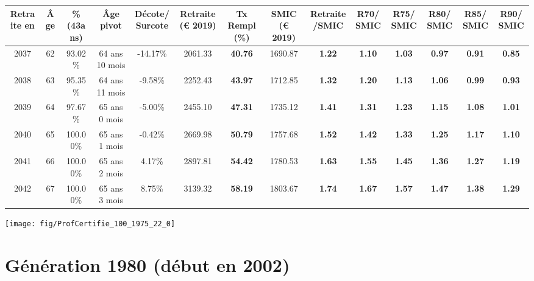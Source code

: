 \begin{adjustbox}{max width=\textwidth} 
\begin{tabular}[htb]{|c|c||c|c|c||c|c||c|c||c|c|c|c|c|} 
\hline 
 Retraite en &  Âge &  \%(43ans) &  Âge pivot &  Décote/Surcote &  Retraite (\euro{} 2019) &  Tx Rempl(\%) &  SMIC (\euro{} 2019) &  Retraite/SMIC &  R70/SMIC &  R75/SMIC &  R80/SMIC &  R85/SMIC &  R90/SMIC \\ 
\hline \hline 
 2037 &  62 &  93.02\% &  64 ans 10 mois &  -14.17\% &  2061.33 &  {\bf 40.76} &  1690.87 &  {\bf 1.22} &  {\bf 1.10} &  {\bf 1.03} &  {\bf {\color{red} 0.97}} &  {\bf {\color{red} 0.91}} &  {\bf {\color{red} 0.85}} \\ 
\hline 
 2038 &  63 &  95.35\% &  64 ans 11 mois &  -9.58\% &  2252.43 &  {\bf 43.97} &  1712.85 &  {\bf 1.32} &  {\bf 1.20} &  {\bf 1.13} &  {\bf 1.06} &  {\bf {\color{red} 0.99}} &  {\bf {\color{red} 0.93}} \\ 
\hline 
 2039 &  64 &  97.67\% &  65 ans 0 mois &  -5.00\% &  2455.10 &  {\bf 47.31} &  1735.12 &  {\bf 1.41} &  {\bf 1.31} &  {\bf 1.23} &  {\bf 1.15} &  {\bf 1.08} &  {\bf 1.01} \\ 
\hline 
 2040 &  65 &  100.00\% &  65 ans 1 mois &  -0.42\% &  2669.98 &  {\bf 50.79} &  1757.68 &  {\bf 1.52} &  {\bf 1.42} &  {\bf 1.33} &  {\bf 1.25} &  {\bf 1.17} &  {\bf 1.10} \\ 
\hline 
 2041 &  66 &  100.00\% &  65 ans 2 mois &  4.17\% &  2897.81 &  {\bf 54.42} &  1780.53 &  {\bf 1.63} &  {\bf 1.55} &  {\bf 1.45} &  {\bf 1.36} &  {\bf 1.27} &  {\bf 1.19} \\ 
\hline 
 2042 &  67 &  100.00\% &  65 ans 3 mois &  8.75\% &  3139.32 &  {\bf 58.19} &  1803.67 &  {\bf 1.74} &  {\bf 1.67} &  {\bf 1.57} &  {\bf 1.47} &  {\bf 1.38} &  {\bf 1.29} \\ 
\hline 
\hline 
\end{tabular} 
\end{adjustbox} 
 
 \vspace{0.1cm} 

 {\hspace{-2.2cm}\texttt{[image: fig/ProfCertifie\_100\_1975\_22\_0]}} 

\newpage 
 
\section{Génération 1980 (début en 2002)\label{ProfCertifie_100_1980_22_0}} 
 
